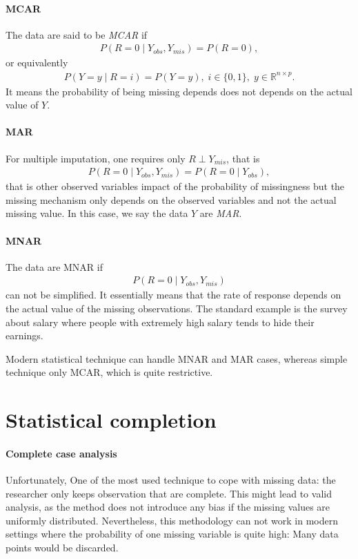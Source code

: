 \paragraph{MCAR}

The data are said to be \emph{MCAR} if
\begin{align*}
P(R=0 \; \vert \;  Y_{obs}, Y_{mis}) = P(R=0),
\end{align*}
or equivalently
\begin{align*}
P(Y = y \; \vert \;  R=i) = P(Y=y),\; i \in \{0, 1\},\; y \in \mathbb{R}^{n\times p}.
\end{align*}
It means the probability of being missing depends does not depends on the
actual value of $Y$.

\paragraph{MAR} For multiple imputation, one requires only $R \perp Y_{mis}$,
that is
\begin{align*}
  P(R=0 \; \vert \;  Y_{obs}, Y_{mis}) = P(R=0 \; \vert \;  Y_{obs}),
\end{align*}
that is other observed variables impact of the probability of missingness but
the missing mechanism only depends on the observed variables and not the actual
missing value. In this case, we say the data $Y$ are \emph{MAR}.

\paragraph{MNAR}
The data are MNAR if
\begin{align*}
  P(R=0 \; \vert \;  Y_{obs}, Y_{mis})
\end{align*}
can not be simplified. It essentially means that the rate of response depends
on the actual value of the missing observations. The standard example is the
survey about salary where people with extremely high salary tends to hide their
earnings.

Modern statistical technique can handle MNAR and MAR cases, whereas simple technique only
MCAR, which is quite restrictive.

\section{Statistical completion}
\label{sec:stand-appr-miss}

\paragraph{Complete case analysis}
Unfortunately, One of the most used technique to cope with missing data: the
researcher only keeps observation that are complete. This might lead to valid
analysis, as the method does not introduce any bias if the missing values are
uniformly distributed. Nevertheless, this methodology can not work in modern
settings where the probability of one missing variable is quite high: Many data
points would be discarded.

